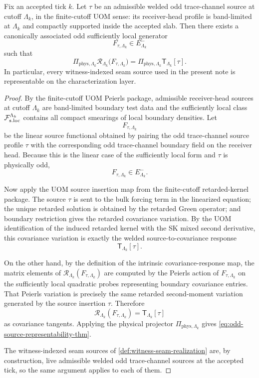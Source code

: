 \documentclass[11pt]{article}
\begin{document}
\begin{theorem}
\label{thm:odd-source-representability}
Fix an accepted tick \(k\).
Let \(\tau\) be an admissible welded odd trace-channel source at cutoff \(\Lambda_k\), in the
finite-cutoff UOM sense: its receiver-head profile is band-limited at \(\Lambda_k\) and compactly
supported inside the accepted slab.
Then there exists a canonically associated odd sufficiently local generator
\[
F_{\tau,\Lambda_k}\in E^-_{\Lambda_k}
\]
such that
\begin{equation}
\Pi_{\mathrm{phys},\Lambda_k}\mathcal R_{\Lambda_k}\!\big(F_{\tau,\Lambda_k}\big)
=
\Pi_{\mathrm{phys},\Lambda_k}\mathsf T_{\Lambda_k}[\tau].
\label{eq:odd-source-representability-thm}
\end{equation}
In particular, every witness-indexed seam source used in the present note is representable on the
characterization layer.
\end{theorem}

\begin{proof}
By the finite-cutoff UOM Peierls package, admissible receiver-head sources at cutoff \(\Lambda_k\)
are band-limited boundary test data and the sufficiently local class
\(\mathcal F_{\rm s.loc}^{\Lambda_k}\) contains all compact smearings of local boundary densities.
Let
\[
F_{\tau,\Lambda_k}
\]
be the linear source functional obtained by pairing the odd trace-channel source profile \(\tau\)
with the corresponding odd trace-channel boundary field on the receiver head.
Because this is the linear case of the sufficiently local form and \(\tau\) is physically odd,
\[
F_{\tau,\Lambda_k}\in E^-_{\Lambda_k}.
\]

Now apply the UOM source insertion map from the finite-cutoff retarded-kernel package.
The source \(\tau\) is sent to the bulk forcing term in the linearized equation; the unique
retarded solution is obtained by the retarded Green operator; and boundary restriction gives the
retarded covariance variation. By the UOM identification of the induced retarded kernel with the SK
mixed second derivative, this covariance variation is exactly the welded source-to-covariance
response
\[
\mathsf T_{\Lambda_k}[\tau].
\]

On the other hand, by the definition of the intrinsic covariance-response map, the matrix elements
of
\(
\mathcal R_{\Lambda_k}(F_{\tau,\Lambda_k})
\)
are computed by the Peierls action of \(F_{\tau,\Lambda_k}\) on the sufficiently local quadratic
probes representing boundary covariance entries.
That Peierls variation is precisely the same retarded second-moment variation generated by the
source insertion \(\tau\).
Therefore
\[
\mathcal R_{\Lambda_k}(F_{\tau,\Lambda_k})
=
\mathsf T_{\Lambda_k}[\tau]
\]
as covariance tangents.
Applying the physical projector \(\Pi_{\mathrm{phys},\Lambda_k}\) gives
\eqref{eq:odd-source-representability-thm}.

The witness-indexed seam sources of \cref{def:witness-seam-realization} are, by construction, live
admissible welded odd trace-channel sources at the accepted tick, so the same argument applies to
each of them.
\end{proof}
\end{document}
